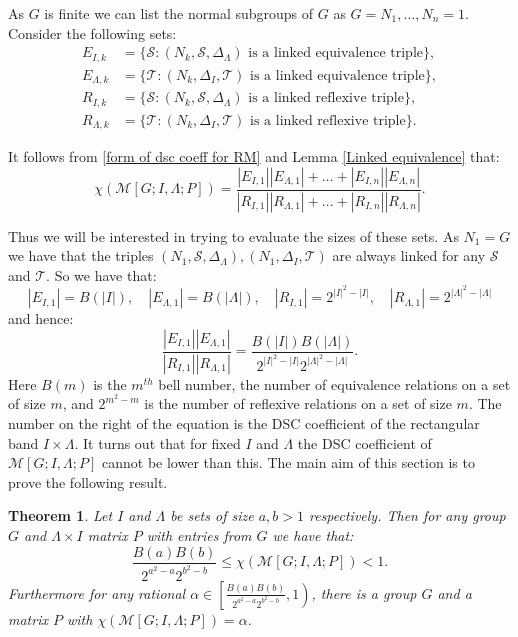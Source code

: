 \documentclass[a4paper, 12pt,reqno]{amsart}
\theoremstyle{plain}
\newtheorem{thm}{Theorem}[section]
\theoremstyle{definition}
\theoremstyle{remark}
\newcommand{\RM}{\mathcal{M}[G;I,\Lambda;P]}
\begin{document}
As $G$ is finite we can list the normal subgroups of $G$ as $G = N_1 , \dots , N_n = 1$.
Consider the following sets:
\begin{align*}
    E_{I,k} &= \{ \mathcal{S} : (N_k,\mathcal{S},\Delta_\Lambda) \text{ is a linked equivalence triple} \}, \\
    E_{\Lambda,k} &= \{ \mathcal{T} : (N_k,\Delta_I,\mathcal{T}) \text{ is a linked equivalence triple} \}, \\
    R_{I,k} &= \{ \mathcal{S} : (N_k,\mathcal{S},\Delta_\Lambda) \text{ is a linked reflexive triple} \}, \\
    R_{\Lambda,k} &= \{ \mathcal{T} : (N_k,\Delta_I,\mathcal{T}) \text{ is a linked reflexive triple} \}.
\end{align*}

It follows from \eqref{form of dsc coeff for RM} and Lemma \ref{Linked equivalence} that:
\begin{equation}
    \label{DSC coef form for Rees matrix}
    \chi(\RM) = \frac{|E_{I,1}||E_{\Lambda ,1}| + \dots + |E_{I,n}||E_{\Lambda,n}|}{|R_{I,1}||R_{\Lambda ,1}| + \dots +|R_{I,n}||R_{\Lambda,n}|}.
\end{equation}

Thus we will be interested in trying to evaluate the sizes of these sets.
As $N_1 = G$ we have that the triples $(N_1 , \mathcal{S}, \Delta_\Lambda),(N_1,\Delta_I,\mathcal{T})$ are always linked for any $\mathcal{S}$ and $\mathcal{T}$.
So we have that:
\begin{equation}
    \label{N = G case}
    |E_{I,1}| = B(|I|) ,\quad |E_{\Lambda,1}| = B(|\Lambda|),\quad |R_{I,1}| = 2^{|I|^2 - |I|}, \quad|R_{\Lambda,1}| = 2^{|\Lambda|^2 - |\Lambda|}
\end{equation}
and hence:
\begin{equation*}
    \frac{|E_{I,1}||E_{\Lambda,1}|}{|R_{I,1}||R_{\Lambda,1}|} = \frac{B(|I|)B(|\Lambda|)}{2^{|I|^2 - |I|}2^{|\Lambda|^2 - |\Lambda|}}.
\end{equation*}
Here $B(m)$ is the $m^{th}$ bell number, the number of equivalence relations on a set of size $m$, and $2^{m^2 - m}$ is the number of reflexive relations on a set of size $m$.
The number on the right of the equation is the DSC coefficient of the rectangular band $I \times \Lambda$.
It turns out that for fixed $I$ and $\Lambda$ the DSC coefficient of $\RM$ cannot be lower than this.
The main aim of this section is to prove the following result.
\begin{thm}
    \label{main theorem section 3}
    Let $I$ and $\Lambda$ be sets of size $a,b>1$ respectively.
    Then for any group $G$ and $\Lambda \times I$ matrix $P$ with entries from $G$ we have that:
    \begin{equation*}
        \frac{B(a)B(b)}{2^{a^2 - a}2^{b^2-b}} \leq \chi(\RM) < 1.
    \end{equation*}
    Furthermore for any rational $\alpha \in \left[ \frac{B(a)B(b)}{2^{a^2 - a}2^{b^2-b}} , 1\right)$, there is a group $G$ and a matrix $P$ with $\chi(\RM) = \alpha$.
\end{thm}
\end{document}
